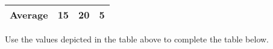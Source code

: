 \documentclass[]{article}
\begin{document}
\begin{longtable}[]{@{}llll@{}}
\begin{minipage}[t]{0.20\columnwidth}\raggedright
Average\strut
\end{minipage} & \begin{minipage}[t]{0.16\columnwidth}\raggedright
15\strut
\end{minipage} & \begin{minipage}[t]{0.16\columnwidth}\raggedright
20\strut
\end{minipage} & \begin{minipage}[t]{0.16\columnwidth}\raggedright
5\strut
\end{minipage}\tabularnewline
\bottomrule
\end{longtable}

Use the values depicted in the table above to complete the table below.

\newpage
\end{document}

